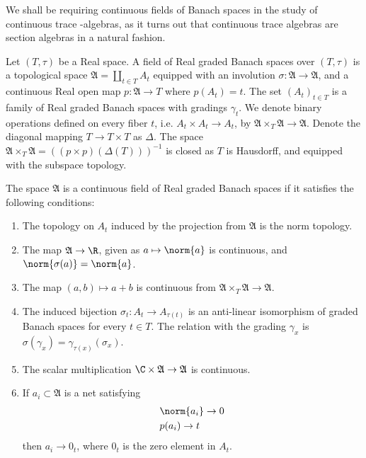 We shall be requiring continuous fields of Banach spaces in the study of continuous trace \Cstar-algebras, as it turns out that continuous trace algebras are section algebras in a natural fashion. 
\begin{definition}\label{bundledef}
	Let $(T,\tau)$ be a Real space. A field of Real graded Banach spaces over $(T,\tau)$ is a topological space $\mathfrak{A}=\coprod_{t\in T} A_t$ equipped with an involution $\sigma:\mathfrak{A}\to\mathfrak{A}$, and a continuous Real open map $p:\mathfrak{A}\to T$ where $p(A_t)=t$. The set $(A_t)_{t\in T}$ is a family of Real graded Banach spaces with gradings $\gamma_t$. We denote binary operations defined on every fiber $t$, i.e. $A_t\times A_t \to A_t$, by $\mathfrak{A} \times_T \mathfrak{A}\to \mathfrak{A}$. Denote the diagonal mapping $T\to T\times T$ as $\Delta$. The space $\mathfrak{A}\times_T \mathfrak{A}=((p\times p)(\Delta(T)))^{-1}$ is closed as $T$ is Hausdorff, and equipped with the subspace topology.


	The space $\mathfrak{A}$ is a continuous field of Real graded Banach spaces if it satisfies the following conditions:
	\begin{enumerate}
	\item
		The topology on $A_t$ induced by the projection from $\mathfrak{A}$ is the norm topology.
	\item
		The map $\mathfrak{A}\to \R$, given as $a\mapsto \norm{a}$ is continuous, and $\norm{\sigma(a)}=\norm{a}$. 
	\item
		The map $(a,b)\mapsto a+b$ is continuous from $\mathfrak{A}\times_T \mathfrak{A}\to \mathfrak{A}$. 
	\item
		The induced bijection $\sigma_t:A_t\to A_{\tau(t)}$ is an anti-linear isomorphism of graded Banach spaces for every $t\in T$. The relation with the grading $\gamma_x$ is $\sigma(\gamma_x)=\gamma_{\tau(x)}(\sigma_x)$.  
	\item
		The scalar multiplication $\C \times \mathfrak{A}\to \mathfrak{A}$ is continuous. 
	\item
		If $a_i\subset \mathfrak{A}$ is a net satisfying 
		\begin{align*}
			&\norm{a_i}\to 0\\
			&p(a_i)\to t
		\end{align*}
		then $a_i\to 0_t$, where $0_t$ is the zero element in $A_t$. 
	\end{enumerate}
\end{definition}
